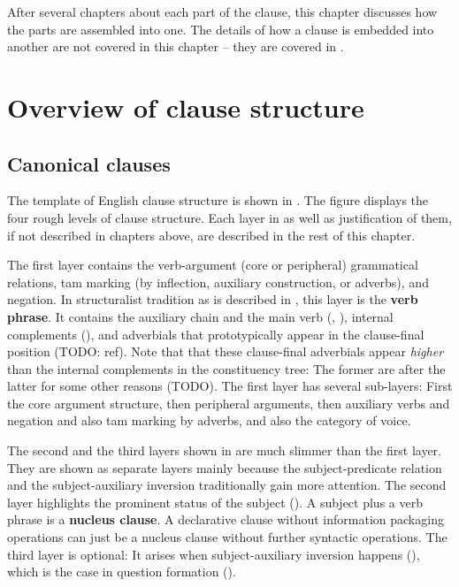 \documentclass[UTF8, a4paper, oneside, scheme=plain]{ctexrep}
\newcommand*{\concept}[1]{\textbf{#1}}
\begin{document}
After several chapters about each part of the clause,
this chapter discusses how the parts are assembled into one.
The details of how a clause is embedded into another are not covered in this chapter
-- they are covered in .

\section{Overview of clause structure}\label{sec:clause-template}

\subsection{Canonical clauses}

The template of English clause structure is shown in .
The figure displays the four rough levels of clause structure.
Each layer in  as well as justification of them,
if not described in chapters above, are described 
in the rest of this chapter.

The first layer contains the verb-argument (core or peripheral) grammatical relations,
\ac{tam} marking (by inflection, auxiliary construction, or adverbs), and negation.
In structuralist tradition as is described in \citet{cgel},
this layer is the \concept{verb phrase}.
It contains the auxiliary chain and the main verb 
(, ),
internal complements (),
and adverbials that prototypically appear in the clause-final position (TODO: ref).
Note that that these clause-final adverbials 
appear \emph{higher} than the internal complements 
in the constituency tree:
The former are after the latter for some other reasons (TODO).
The first layer has several sub-layers:
First the core argument structure,
then peripheral arguments, 
then auxiliary verbs and negation and also \acs{tam} marking by adverbs,
and also the category of voice. 

The second and the third layers shown in 
are much slimmer than the first layer.
They are shown as separate layers mainly because 
the subject-predicate relation 
and the subject-auxiliary inversion 
traditionally gain more attention.
The second layer highlights the prominent status of the subject ().
A subject plus a verb phrase is a \concept{nucleus clause}.
A declarative clause without information packaging operations
can just be a nucleus clause without further syntactic operations.
The third layer is optional:
It arises when subject-auxiliary inversion happens (),
which is the case in %
question formation ().
\end{document}
